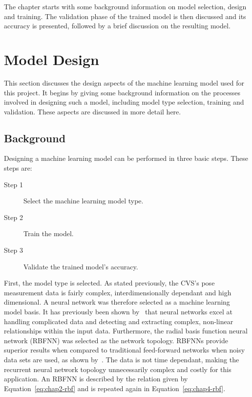 The chapter starts with some background information on model selection, design and training. The validation phase of the trained model is then discussed and its accuracy is presented, followed by a brief discussion on the resulting model. 

\section{Model Design}

This section discusses the design aspects of the machine learning model used for this project. It begins by giving some background information on the processes involved in designing such a model, including model type selection, training and validation. These aspects are discussed in more detail here.  

\subsection{Background}

Designing a machine learning model can be performed in three basic steps. These steps are:

\begin{description}
  \item[Step 1] Select the machine learning model type.
  \item[Step 2] Train the model.
  \item[Step 3] Validate the trained model's accuracy. 
\end{description}

First, the model type is selected. As stated previously, the CVS's pose measurement data is fairly complex, interdimensionally dependant and high dimensional. A neural network was therefore selected as a machine learning model basis. It has previously been shown by~\cite{tu1996advantages} that neural networks excel at handling complicated data and detecting and extracting complex, non-linear relationships within the input data. Furthermore, the radial basis function neural network (RBFNN) was selected as the network topology. RBFNNs provide superior results when compared to traditional feed-forward networks when noisy data sets are used, as shown by~\cite{xie2011comparison}. The data is not time dependant, making the recurrent neural network topology unnecessarily complex and costly for this application. An RBFNN is described by the relation given by Equation~\ref{eq:chap2-rbf} and is repeated again in Equation~\ref{eq:chap4-rbf}.


